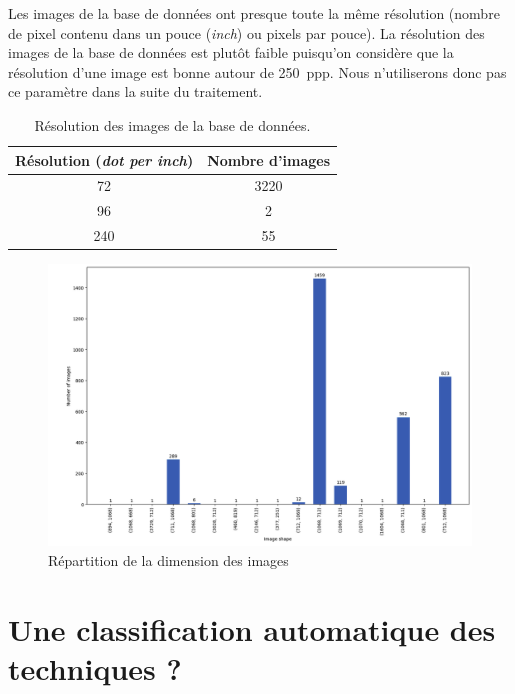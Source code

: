 Les images de la base de données ont presque toute la même résolution (nombre de pixel contenu dans un pouce (\textit{inch}) ou pixels par pouce). La résolution des images de la base de données est plutôt faible puisqu'on considère que la résolution d'une image est bonne autour de 250~ppp. Nous n'utiliserons donc pas ce paramètre dans la suite du traitement.

\begin{table}[!h]
    \centering
    \begin{tabular}{|c|c|}
        \hline
         \cellcolor{blue!20}\textbf{Résolution (\textit{dot per inch})} & \cellcolor{blue!20}\textbf{Nombre d'images} \\ \hline \hline
         72 &  3220 \\ \hline
         96 & 2 \\ \hline
         240 & 55 \\ \hline
    \end{tabular}
    \caption{Résolution des images de la base de données.}
    \label{tab:resolution}
\end{table}

\clearpage

\begin{figure}[!h]
	\begin{center}
		\includegraphics[width=16cm]{../images/dimension.png}
	 \end{center}
	 \caption{Répartition de la dimension des images}
\end{figure}


\section{Une classification automatique des techniques ?}

